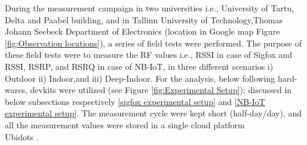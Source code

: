 \documentclass[12pt]{article}
\begin{document}
During the measurement campaign in two universities i.e., University of Tartu, Delta and Paabel building, and in Tallinn University of Technology,Thomas Johann Seebeck Department of Electronics (location in Google map Figure \ref{fig:Observation locations}), a series of field tests were performed. The purpose of these field tests were to measure the RF  values i.e., RSSI in case of Sigfox and RSSI, RSRP, and RSRQ in case of NB-IoT, in three different scenarios i) Outdoor ii) Indoor,and iii) Deep-Indoor. For the analysis, below following hard-wares, devkits were utilized (see Figure \ref{fig:Experimental Setup}); discussed in below subsections respectively \ref{sigfox experimental setup} and \ref{NB-IoT experimental setup}. The measurement cycle were kept short (half-day/day), and all the measurement values were stored in a single cloud platform \\Ubidots \cite{ubidots}.
\end{document}
